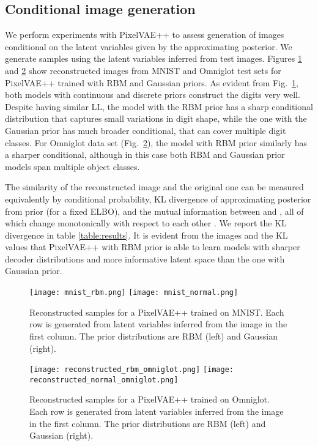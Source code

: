 \documentclass{article}
\begin{document}
\subsection{Conditional image generation}
We perform experiments with PixelVAE++ to assess generation of images  conditional on the latent variables given by the approximating posterior. We generate samples using the latent variables inferred from test images. Figures \ref{fig:mnist_cond} and \ref{fig:omni_cond} show reconstructed images from MNIST and Omniglot test sets for  PixelVAE++ trained with RBM and Gaussian priors. As evident from Fig.~\ref{fig:mnist_cond}, both models with continuous and discrete priors construct the digits very well. Despite having similar LL, the model with the RBM prior has a sharp conditional distribution that captures small variations in digit shape, while the one with the Gaussian prior has much broader conditional, that can cover multiple digit classes. For Omniglot data set (Fig.~\ref{fig:omni_cond}), the model with RBM prior similarly has a sharper conditional, although in this case both RBM and Gaussian prior models span multiple object classes.

The similarity of the reconstructed image and the original one can be measured equivalently by conditional probability, KL divergence of approximating posterior from prior (for a fixed ELBO), and the mutual information between  and , all of which change monotonically with respect to each other \cite{alemi2017fixing}. We report the KL divergence in table \ref{table:results}. It is evident from the images and the KL values that PixelVAE++ with RBM prior is able to learn models with sharper decoder distributions and more informative latent space than the one with Gaussian prior.

\begin{figure}[h]
    \centering
    \texttt{[image: mnist\_rbm.png]}
    \texttt{[image: mnist\_normal.png]}
    \caption{Reconstructed samples for a PixelVAE++ trained on MNIST. Each row is generated from latent variables inferred from the image in the first column. The prior distributions are RBM (left) and Gaussian (right).}
    \label{fig:mnist_cond}
\end{figure}

\begin{figure}[h]
    \centering
    \texttt{[image: reconstructed\_rbm\_omniglot.png]}
    \texttt{[image: reconstructed\_normal\_omniglot.png]}
    \caption{Reconstructed samples for a PixelVAE++ trained on Omniglot. Each row is generated from latent variables inferred from the image in the first column. The prior distributions are RBM (left) and Gaussian (right).}
    \label{fig:omni_cond}

\end{figure}
\end{document}
